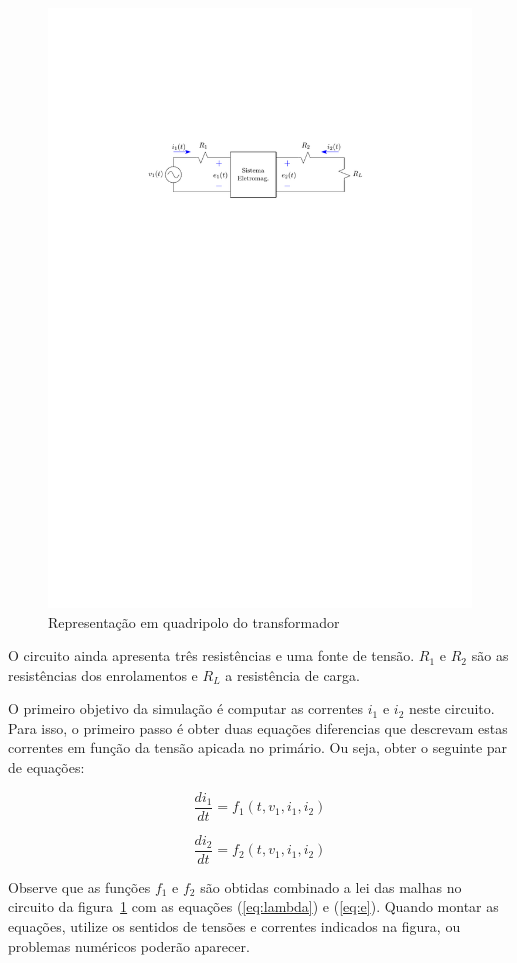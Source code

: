 \documentclass[a4paper]{article}
\theoremstyle{definition}
\theoremstyle{plain}
\begin{document}
\begin{figure}[H]
\centering
\includegraphics[width=0.75\linewidth]{../../Figuras/Trafo_mono_sistema_eletromag.pdf}
\caption{Representação em quadripolo do transformador}
\label{fig:trafo:quadri}
\end{figure}


O circuito ainda apresenta três resistências e uma fonte de tensão. $R_1$ e $R_2$ são as resistências dos enrolamentos e $R_L$ a resistência de carga.  

O primeiro objetivo da simulação é computar as correntes $i_1$ e $i_2$ neste circuito. Para isso, o primeiro passo é obter duas equações diferencias que descrevam estas correntes em função da tensão apicada no primário. Ou seja, obter o seguinte par de equações:

\begin{equation}
\frac{d i_1}{dt} = f_1(t,v_1, i_1, i_2)
\end{equation} 

\begin{equation}
\frac{d i_2}{dt} = f_2(t,v_1,  i_1, i_2)
\end{equation} 

Observe que as funções $f_1$ e $f_2$ são obtidas combinado a lei das malhas no circuito da figura~\ref{fig:trafo:quadri} com as equações (\ref{eq:lambda}) e (\ref{eq:e}). Quando montar as equações, utilize os sentidos de tensões e correntes indicados na figura, ou problemas numéricos poderão aparecer.
\end{document}
